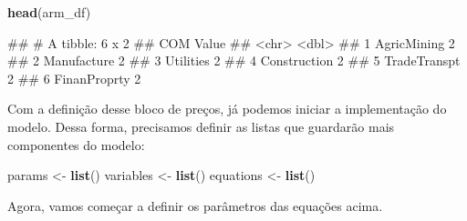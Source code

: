 \documentclass[12pt,twoside]{article}
\newenvironment{Shaded}{\begin{snugshade}}{\end{snugshade}}
\newcommand{\KeywordTok}[1]{\textcolor[rgb]{0.13,0.29,0.53}{\textbf{#1}}}
\newcommand{\NormalTok}[1]{#1}
\newcommand{\StringTok}[1]{\textcolor[rgb]{0.31,0.60,0.02}{#1}}
\let\oldShaded\Shaded
\let\endoldShaded\endShaded
\renewenvironment{Shaded}{\footnotesize\oldShaded}{\endoldShaded}
\let\oldverbatim\verbatim
\let\endoldverbatim\endverbatim
\renewenvironment{verbatim}{\footnotesize\oldverbatim}{\endoldverbatim}
\begin{document}
\begin{Shaded}
\begin{Highlighting}[]
\KeywordTok{head}\NormalTok{(arm_df)}
\end{Highlighting}
\end{Shaded}

\begin{verbatim}
## # A tibble: 6 x 2
##   COM          Value
##   <chr>        <dbl>
## 1 AgricMining      2
## 2 Manufacture      2
## 3 Utilities        2
## 4 Construction     2
## 5 TradeTranspt     2
## 6 FinanProprty     2
\end{verbatim}

Com a definição desse bloco de preços, já podemos iniciar a
implementação do modelo. Dessa forma, precisamos definir as listas que
guardarão mais componentes do modelo:

\begin{Shaded}
\begin{Highlighting}[]
\NormalTok{params <-}\StringTok{ }\KeywordTok{list}\NormalTok{()}
\NormalTok{variables <-}\StringTok{ }\KeywordTok{list}\NormalTok{()}
\NormalTok{equations <-}\StringTok{ }\KeywordTok{list}\NormalTok{()}
\end{Highlighting}
\end{Shaded}

Agora, vamos começar a definir os parâmetros das equações acima.
\end{document}
